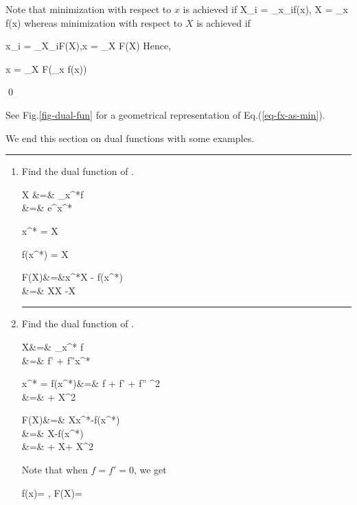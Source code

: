 Note that minimization
with respect to $x$
is achieved if
\beq
X_i = \partial_{x_i}f(x),\;
X = \nabla_x f(x)
\eeq
whereas minimization 
with respect to $X$
is achieved if 

\beq
x_i = \partial_{X_i}F(X),\;x = \nabla_X F(X)
\eeq
Hence,

\beq
x = \nabla_X F(\nabla_x f(x))
\eeq

\qed

See Fig.\ref{fig-dual-fun}
for a geometrical
representation
of Eq.(\ref{eq-fx-as-min}).

We end this section
on dual functions with some
examples.
\hrule
\begin{enumerate}
\item
Find the dual function of
\beq
{}
\;.
\eeq

\beqa
X &=& \partial_{x^*}f
\\
&=&
e^{x^*}
\eeqa

\beq
x^* = \ln  X
\eeq

\beq
f(x^*) = X
\eeq

\beqa
F(X)&=&x^*X - f(x^*)
\\
&=&
X\ln X -X
\eeqa



\hrule
\item 
Find the dual function of
\beq
{}
\;.
\eeq

\beqa
X&=&
\partial_{x^*} f
\\
&=&
f' + f''x^*
\label{eq-X-xstar}
\eeqa

\beq
x^* = 
\eeq
\beqa
f(x^*)&=& f
+
f' 
+
f''
^2
\\
&=&
+
X^2
\eeqa

\beqa
F(X)&=&
Xx^*-f(x^*)
\\
&=&
X
-f(x^*)
\\
&=&
+
X
+
X^2
\eeqa

Note that when $f=f'=0$,
we get 

\beq
f(x)= 
,\quad 
F(X)= 
\eeq

%
%
%
%


\end{enumerate}
